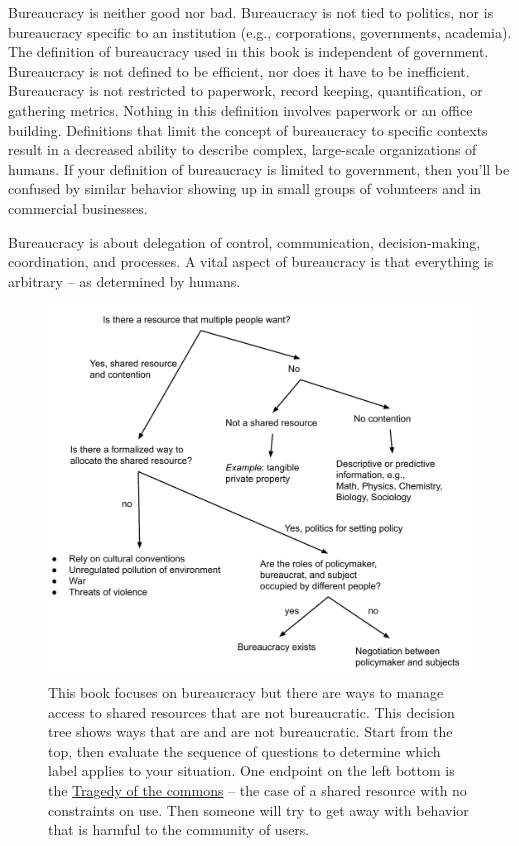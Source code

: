 Bureaucracy is neither good nor bad. Bureaucracy is not tied to politics, nor is bureaucracy specific to an institution (e.g., corporations, governments, academia). The definition of bureaucracy used in this book is independent of government. Bureaucracy is not defined to be efficient, nor does it have to be inefficient. Bureaucracy is not restricted to paperwork, record keeping, quantification, or gathering metrics. Nothing in this definition involves paperwork or an office building. Definitions that limit the concept of bureaucracy to specific contexts result in a decreased ability to describe complex, large-scale organizations of humans. If your definition of bureaucracy is limited to government, then you'll be confused by similar behavior showing up in small groups of volunteers and in commercial businesses.

Bureaucracy is about delegation of control, communication, decision-making, coordination, and processes. 
A vital aspect of bureaucracy is that everything is arbitrary -- as determined by humans.



\begin{figure}
    \centering
    \includegraphics[width=1.05\textwidth]{images/relation_between_shared_resource_and_bureaucarcy.pdf}
    \caption{This book focuses on bureaucracy but there are ways to manage access to shared resources that are not bureaucratic.  
    This decision tree shows ways that are and are not bureaucratic. Start from the top, then evaluate the sequence of questions to determine which label applies to your situation.
    One endpoint on the left bottom is 
    the \href{https://en.wikipedia.org/wiki/Tragedy_of_the_commons}{Tragedy of the commons}  
    -- the case of a shared resource with no constraints on use. Then someone will try to get away with behavior that is harmful to the community of users. }
    \label{fig:am-I-a-bureaucrat}
\end{figure}

